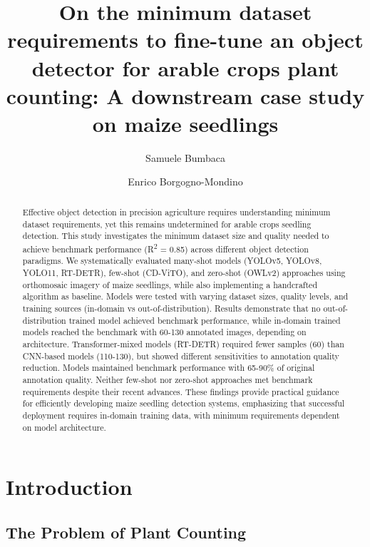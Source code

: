\documentclass{article}
\title{On the minimum dataset requirements to fine-tune an object detector for arable crops plant counting: A downstream case study on maize seedlings}
\author[1*]{Samuele Bumbaca}
\author[1]{Enrico Borgogno-Mondino}
\affil[1]{Department of Agricultural, Forest and Food Sciences, University of Turin, 10095 Grugliasco, Italy}
\affil[*]{Address correspondence to: samuele.bumbaca@unito.it}
\date{}
\begin{document}
\maketitle

\begin{abstract}
Effective object detection in precision agriculture requires understanding 
minimum dataset requirements, yet this remains undetermined for arable crops seedling detection. 
This study investigates the minimum dataset size and quality needed to achieve benchmark 
performance (R\textsuperscript{2} = 0.85) across different object detection paradigms. We systematically 
evaluated many-shot models (YOLOv5, YOLOv8, YOLO11, RT-DETR), few-shot (CD-ViTO), 
and zero-shot (OWLv2) approaches using orthomosaic imagery of maize seedlings, while 
also implementing a handcrafted algorithm as baseline. Models were tested with varying 
dataset sizes, quality levels, and training sources (in-domain vs out-of-distribution). 
Results demonstrate that no out-of-distribution trained model achieved benchmark 
performance, while in-domain trained models reached the benchmark with 60-130 annotated 
images, depending on architecture. Transformer-mixed models (RT-DETR) required fewer 
samples (60) than CNN-based models (110-130), but showed different sensitivities 
to annotation quality reduction. Models maintained benchmark performance with 65-90\% 
of original annotation quality. Neither few-shot nor zero-shot approaches met benchmark 
requirements despite their recent advances. These findings provide practical guidance 
for efficiently developing maize seedling detection systems, emphasizing that successful 
deployment requires in-domain training data, with minimum requirements dependent 
on model architecture.
\end{abstract}


\section{Introduction}

\subsection*{The Problem of Plant Counting}
\end{document}

